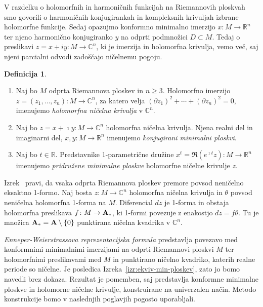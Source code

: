 \documentclass[12pt,a4paper,twoside]{article}
\theoremstyle{definition} %
\newtheorem{definicija}{Definicija}[section]
\theoremstyle{plain} %
\numberwithin{equation}{section}  %
\newcommand{\R}{\mathbb R}
\newcommand{\C}{\mathbb C}
\begin{document}
V razdelku o holomorfnih in harmoničnih funkcijah na Riemannovih ploskvah smo govorili o harmoničnih konjugirankah in kompleksnih krivuljah izbrane holomorfne funkcije. Sedaj opazujmo konformno minimalno imerzijo $x \colon M \to \mathbb{R}^{n}$ ter njeno harmonično konjugiranko $y$ na odprti podmnožici $D \subset M$. Tedaj o preslikavi $z = x + iy \colon M \to \mathbb{C}^{n}$, ki je imerzija in holomorfna krivulja, vemo več, saj njeni parcialni odvodi zadoščajo ničelnemu pogoju.
%
\begin{definicija}
\begin{enumerate}
\item
Naj bo $M$ odprta Riemannova ploskev in $n \geq 3$. Holomorfno imerzijo $z = (z_{1}, \dots , z_{n}) \colon M \to \C^{n}$, za katero velja
$(\partial{z_{1}})^2 + \cdots + (\partial{z_{n}})^2 = 0$, imenujemo \emph{holomorfna ničelna krivulja} v $\C^{n}$.
\item
Naj bo $z = x + \imath y \colon M \to \C^{n}$ holomorfna ničelna krivulja. Njena realni del in imaginarni del, $x, y \colon M \to \R^{n}$ imenujemo \emph{konjugirani minimalni ploskvi}.
\item
Naj bo $t \in \R$. Predstavnike 1-parametrične družine $x^{t} = \Re{(e^{\imath t} z)} \colon M \to \R^{n}$ imenujemo \emph{pridružene minimalne ploskve} holomorfne ničelne krivulje $z$.
\end{enumerate}
\end{definicija}

Izrek~\cite[Theorem~1.10.5]{alarcon2021minimal} pravi, da vsaka odprta Riemannova ploskev premore povsod neničelno eksaktno 1-formo.
Naj bosta $z \colon M \to \mathbb{C}^{n}$ holomorfna ničelna krivulja in $\theta$ povsod neničelna holomorfna 1-forma na $M$. Diferencial $dz$ je 1-forma in obstaja holomorfna preslikava $f \colon M \to \textbf{\textup{A}}_{*}$, ki 1-formi povezuje z enakostjo $dz = f \theta$. Tu je množica $\textbf{\textup{A}}_{*} = \textbf{\textup{A}} \setminus \{0\}$ punktirana ničelna kvadrika v $\mathbb{C}^{n}$.

\emph{Enneper-Weierstrassova reprezentacijska formula} predstavlja povezavo med konformnimi minimalnimi imerzijami na odprti Riemannovi ploskvi $M$ ter holomorfnimi preslikavami med $M$ in punktirano ničelno kvadriko, katerih realne periode so ničelne. Je posledica Izreka~\ref{izr:ekviv-min-ploskev}, zato jo bomo navedli brez dokaza. Rezultat je pomemben, saj predstavlja konformne minimalne ploskve in holomorne ničelne krivulje, konstruirane na univerzalen način. Metodo konstrukcije bomo v naslednjih poglavjih pogosto uporabljali.
\end{document}

